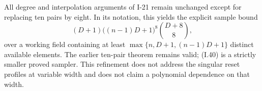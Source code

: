All degree and interpolation arguments of I-21 remain
unchanged except for replacing ten pairs by eight.  In its
notation, this yields the explicit sample bound
\[
 (D+1)\bigl((n-1)D+1\bigr)^8\binom{D+8}{8},
 \tag{I.41}
\]
over a working field containing at least
$\max\{n,D+1,(n-1)D+1\}$ distinct available elements.
The earlier ten-pair theorem remains valid; (I.40) is a
strictly smaller proved sampler.  This refinement does not
address the singular reset profiles at variable width and
does not claim a polynomial dependence on that width.
